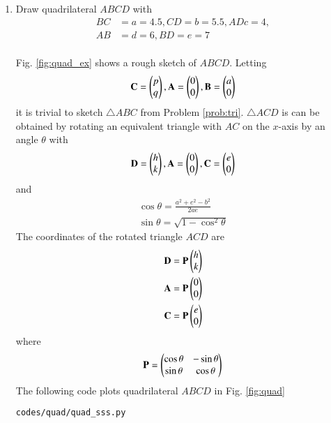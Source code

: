 \renewcommand{\theequation}{\theenumi}
\begin{enumerate}[label=\arabic*.,ref=\thesubsection.\theenumi]

\item Draw quadrilateral $ABCD$ with 
\begin{align}
BC &= a = 4.5,  
CD = b = 5.5, 
AD c = 4,
\\  
AB &= d = 6,
BD = e = 7 
\end{align}
\\
\solution Fig. \ref{fig:quad_ex} shows a rough sketch of $ABCD$. Letting
\begin{align}
\label{eq:tri_basic_new}
\mathbf{C} = \begin{pmatrix}p\\q\end{pmatrix}, \mathbf{A} = \begin{pmatrix}0\\0\end{pmatrix}, \mathbf{B} = \begin{pmatrix}a\\0\end{pmatrix}
\end{align}
%
it is trivial to sketch $\triangle ABC$ from  Problem \ref{prob:tri}.
%
$\triangle ACD$ is can be obtained by rotating an equivalent triangle with $AC$ on
the $x$-axis by an angle $\theta$ with
\begin{align}
\label{eq:tri_basic_rot}
\mathbf{D} = \begin{pmatrix}h\\k\end{pmatrix}, \mathbf{A} = \begin{pmatrix}0\\0\end{pmatrix}, \mathbf{C} = \begin{pmatrix}e\\0\end{pmatrix}
\end{align}
%
and
\begin{align}
\label{eq:tri_rot_ang}
\cos \theta = \frac{a^2+e^2-b^2}{2ae}
\\
\sin \theta = \sqrt{1-\cos^2\theta}
\end{align}
%
The coordinates of the rotated triangle $ACD$ are
\begin{align}
\label{eq:tri_rot_trans}
\mathbf{D} = \mathbf{P}\begin{pmatrix}h\\k\end{pmatrix}
\\
\mathbf{A} = \mathbf{P}\begin{pmatrix}0\\0\end{pmatrix}
\\
\mathbf{C} = \mathbf{P}\begin{pmatrix}e\\0\end{pmatrix}
\end{align}
%
where 
\begin{align}
\label{eq:tri_rot_mat}
\mathbf{P} = \begin{pmatrix}\cos\theta & -\sin \theta\\ \sin \theta & \cos \theta\end{pmatrix}
\end{align}
The following code plots quadrilateral $ABCD$ in Fig. \ref{fig:quad}
\begin{lstlisting}
codes/quad/quad_sss.py
\end{lstlisting}
%
\end{enumerate}
%
